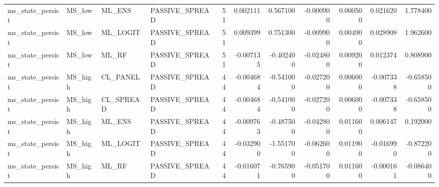 \begin{table}
\begin{tabular}{llllrrrrrrr}
ms_state_persist & MS_low & ML_ENS & PASSIVE_SPREAD & 51 & 0.002111 & 0.567100 & -0.000900 & 0.000500 & 0.021620 & 1.778400 \\
ms_state_persist & MS_low & ML_LOGIT & PASSIVE_SPREAD & 51 & 0.009399 & 0.751300 & -0.009900 & 0.004900 & 0.028908 & 1.962600 \\
ms_state_persist & MS_low & ML_RF & PASSIVE_SPREAD & 51 & -0.007135 & -0.402400 & -0.024800 & 0.009200 & 0.012374 & 0.808900 \\
ms_state_persist & MS_high & CL_PANEL & PASSIVE_SPREAD & 44 & -0.004684 & -0.541000 & -0.027200 & 0.006000 & -0.007338 & -0.658500 \\
ms_state_persist & MS_high & CL_SPREAD & PASSIVE_SPREAD & 44 & -0.004684 & -0.541000 & -0.027200 & 0.006000 & -0.007338 & -0.658500 \\
ms_state_persist & MS_high & ML_ENS & PASSIVE_SPREAD & 44 & -0.009763 & -0.487500 & -0.042800 & 0.011600 & 0.006147 & 0.192000 \\
ms_state_persist & MS_high & ML_LOGIT & PASSIVE_SPREAD & 44 & -0.032900 & -1.551700 & -0.062600 & 0.011900 & -0.016990 & -0.872200 \\
ms_state_persist & MS_high & ML_RF & PASSIVE_SPREAD & 44 & -0.016071 & -0.765900 & -0.051700 & 0.011600 & -0.000161 & -0.086400 \\
\bottomrule
\end{tabular}
\end{table}
